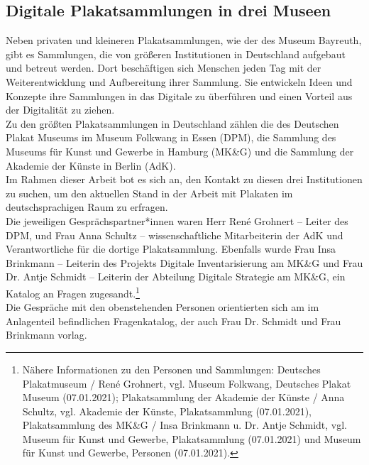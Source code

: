 \documentclass[a4paper,12pt,ngerman]{article}
\begin{document}
\subsection{Digitale Plakatsammlungen in drei Museen}
Neben privaten und kleineren Plakatsammlungen, wie der des Museum Bayreuth, gibt es Sammlungen, die von größeren Institutionen in Deutschland aufgebaut und betreut werden. Dort beschäftigen sich Menschen jeden Tag mit der Weiterentwicklung und Aufbereitung ihrer Sammlung. Sie entwickeln Ideen und Konzepte ihre Sammlungen in das Digitale zu überführen und einen Vorteil aus der Digitalität zu ziehen. \\
Zu den größten Plakatsammlungen in Deutschland zählen die des Deutschen Plakat Museums im Museum Folkwang in Essen (DPM), die Sammlung des Museums für Kunst und Gewerbe in Hamburg (MK\&G) und die Sammlung der Akademie der Künste in Berlin (AdK). \\
Im Rahmen dieser Arbeit bot es sich an, den Kontakt zu diesen drei Institutionen zu suchen, um den aktuellen Stand in der Arbeit mit Plakaten im deutschsprachigen Raum zu erfragen. \\
Die jeweiligen Gesprächspartner*innen waren Herr René Grohnert -- Leiter des DPM, und Frau Anna Schultz -- wissenschaftliche Mitarbeiterin der AdK und Verantwortliche für die dortige Plakatsammlung. Ebenfalls wurde Frau Insa Brinkmann -- Leiterin des Projekts Digitale Inventarisierung am MK\&G und Frau Dr. Antje Schmidt -- Leiterin der Abteilung Digitale Strategie am MK\&G, ein Katalog an Fragen zugesandt.\footnote{Nähere Informationen zu den Personen und Sammlungen: Deutsches Plakatmuseum / René Grohnert, vgl. Museum Folkwang, Deutsches Plakat Museum (07.01.2021); Plakatsammlung der Akademie der Künste / Anna Schultz, vgl. Akademie der Künste, Plakatsammlung (07.01.2021), Plakatsammlung des MK\&G / Insa Brinkmann u. Dr. Antje Schmidt, vgl. Museum für Kunst und Gewerbe, Plakatsammlung (07.01.2021) und Museum für Kunst und Gewerbe, Personen (07.01.2021).} \\
Die Gespräche mit den obenstehenden Personen orientierten sich am im Anlagenteil befindlichen Fragenkatalog, der auch Frau Dr. Schmidt und Frau Brinkmann vorlag. \\
\end{document}
